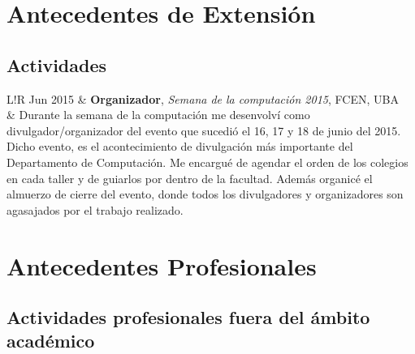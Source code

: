 \documentclass[10pt]{article}
\newcommand\VRule{\color{lightgray}\vrule width 0.5pt}
\begin{document}
\newpage

\section{Antecedentes de Extensión}

\subsection*{Actividades}

\begin{tabular}{L!{\VRule}R}
Jun 2015 & \textbf{Organizador}, \textit{Semana de la computación 2015}, FCEN, UBA\\
& Durante la semana de la computación me desenvolví como divulgador/organizador del evento que sucedió el 16, 17 y 18 de
junio del 2015. Dicho evento, es el acontecimiento de divulgación más importante del Departamento de Computación. Me encargué de
agendar el orden de los colegios en cada taller y de guiarlos por dentro de la facultad. Además organicé el almuerzo de
cierre del evento, donde todos los divulgadores y organizadores son agasajados por el trabajo realizado.\\

\end{tabular}

\newpage

\section{Antecedentes Profesionales}

\subsection*{Actividades profesionales fuera del ámbito académico}
\end{document}

